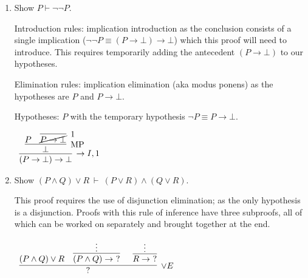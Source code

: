 \documentclass[11pt]{report}
\begin{document}
\begin{enumerate}
	\vspace{0.5cm}

	\item Show $ P\vdash \lnot \lnot  P$.

	\hspace{0.2cm}{\bf Solution}

	Introduction rules: implication introduction as the conclusion consists of a single implication ($\lnot \lnot P \equiv (P \to \bot) \to \bot$) which this proof will need to introduce. This requires temporarily adding the antecedent $(P \to \bot)$ to our hypotheses. 

	Elimination rules: implication elimination (aka modus ponens) as the hypotheses are $P$ and $P \to \bot$. 

	\vspace{0.3cm}
	
	Hypotheses: $P$ with the temporary hypothesis $\lnot P \equiv P \to \bot$.

	\begin{mdframed}
		\begin{center}
			$\begin{array}{c}
				\infer[\to I,1]{(P \to \bot) \to \bot}
					{\infer[\MP]{\bot}
						{P
						&
						\infer[1]{\cancel{P \to \bot}}{}}}			
			\end{array}$
		\end{center}
	\end{mdframed}

	\newpage
	\item Show $( P\land  Q) \lor  R \ \vdash \ ( P\lor  R) \land ( Q \lor  R)$.

	\hspace{0.2cm}{\bf Solution}

	This proof requires the use of disjunction elimination; as the only hypothesis is a disjunction. Proofs with this rule of inference have three subproofs, all of which can be worked on separately and brought together at the end. 

	\begin{center}
		$\begin{array}{c}
			\infer[\lor E]{?}{(P \land Q) \lor R
							  &
							  \infer[]{(P \land Q) \to \ ?}{\vdots}
							  &
							  \infer[]{R \to \ ?}{\vdots}}
		\end{array}$
	\end{center}


\end{enumerate}
\end{document}
